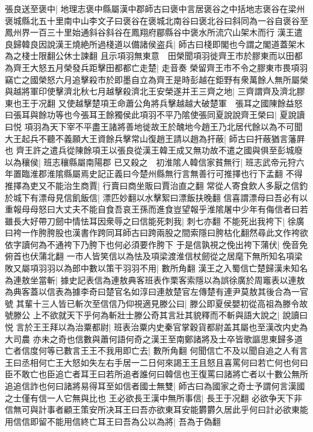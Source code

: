 張良送至褒中|{
	地理志褒中縣屬漢中郡師古曰褒中言居褒谷之中括地志褒谷在梁州褒城縣北五十里南中山李文子曰褒谷在褒城北南谷曰褒北谷曰斜同為一谷自褒谷至鳳州界一百三十里始通斜谷斜谷在鳳翔府郿縣谷中褒水所流穴山架木而行}
漢王遣良歸韓良因說漢王燒絶所過棧道以備諸侯盗兵|{
	師古曰棧即閣也今謂之閣道蓋架木為之棧士限翻公休士諫翻}
且示項羽無東意　田榮聞項羽徙齊王市於膠東而以田都為齊王大怒五月榮發兵距擊田都都亡走楚|{
	走音奏}
榮留齊王市不令之膠東市畏項羽竊亡之國榮怒六月追擊殺市於即墨自立為齊王是時彭越在鉅野有衆萬餘人無所屬榮與越將軍印使擊濟北秋七月越擊殺濟北王安榮遂并王三齊之地|{
	三齊謂齊及濟北膠東也王于况翻}
又使越擊楚項王命蕭公角將兵擊越越大破楚軍　張耳之國陳餘益怒曰張耳與餘功等也今張耳王餘獨侯此項羽不平乃隂使張同夏說說齊王榮曰|{
	夏說讀曰悦}
項羽為天下宰不平盡王諸將善地徙故王於醜地今趙王乃北居代餘以為不可聞大王起兵不聽不義願大王資餘兵擊常山復趙王請以趙為扞蔽|{
	師古曰扞蔽猶言藩屛也}
齊王許之遣兵從陳餘項王以張良從漢王韓王成又無功故不遣之國與俱至彭城廢以為穰侯|{
	班志穰縣屬南陽郡}
已又殺之　初淮隂人韓信家貧無行|{
	班志武帝元狩六年置臨淮郡淮隂縣屬焉史記正義曰今楚州縣無行言無善行可推擇也行下孟翻}
不得推擇為吏又不能治生商賈|{
	行賣曰商坐販曰賈治直之翻}
常從人寄食飲人多厭之信釣於城下有漂母見信飢飯信|{
	漂匹妙翻以水擊絮曰漂飯扶晚翻}
信喜謂漂母曰吾必有以重報母母怒曰大丈夫不能自食吾哀王孫而進食豈望報乎淮隂屠中少年有侮信者曰若雖長大好帶刀劒中情怯耳因衆辱之曰信能死刺我|{
	刺七亦翻}
不能死出我袴下|{
	徐廣曰袴一作胯胯股也漢書作跨同耳師古曰跨兩股之間索隱曰胯枯化翻然尋此文作袴欲依字讀何為不通袴下乃胯下也何必須要作胯下}
于是信孰視之俛出袴下蒲伏|{
	俛音免俯首也伏蒲北翻}
一市人皆笑信以為怯及項梁渡淮信杖劒從之居麾下無所知名項梁敗又屬項羽羽以為郎中數以策干羽羽不用|{
	數所角翻}
漢王之入蜀信亡楚歸漢未知名為連敖坐當斬|{
	據史記表信為連敖典客班表作栗客索隱以為誤徐廣於周竈表以連敖為典客蓋以信表為據李奇曰楚官名如淳曰連敖楚官左傳楚有連尹莫敖其後合為一官號}
其輩十三人皆已斬次至信信乃仰視適見滕公曰|{
	滕公即夏侯嬰初從高祖為滕令故號滕公}
上不欲就天下乎何為斬壯士滕公奇其言壯其貌釋而不斬與語大說之|{
	說讀曰悦}
言於王王拜以為治粟都尉|{
	班表治粟内史秦官掌穀貨都尉盖其屬也至漢改内史為大司農}
亦未之奇也信數與蕭何語何奇之漢王至南鄭諸將及士卒皆歌謳思東歸多道亡者信度何等已數言王王不我用即亡去|{
	數所角翻}
何聞信亡不及以聞自追之人有言王曰丞相何亡王大怒如失左右手居一二日何來謁王王且怒且喜罵何曰若亡何也何曰臣不敢亡也臣追亡者耳王曰若所追者誰何曰韓信也王復罵曰諸將亡者以十數公無所追追信詐也何曰諸將易得耳至如信者國士無雙|{
	師古曰為國家之奇士予謂何言漢國之士僅有信一人它無與比也}
王必欲長王漢中無所事信|{
	長王于况翻}
必欲争天下非信無可與計事者顧王策安所决耳王曰吾亦欲東耳安能欝欝久居此乎何曰計必欲東能用信信即留不能用信終亡耳王曰吾為公以為將|{
	吾為于偽翻}
